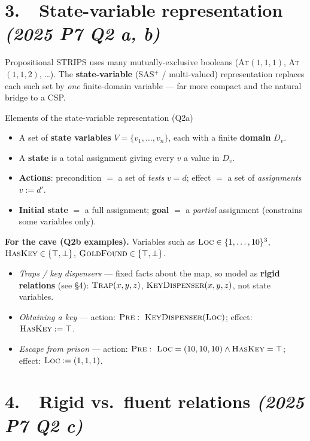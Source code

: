\documentclass[11pt,a4paper]{article}
\newcommand{\pred}[1]{\textsc{#1}}
\newcommand{\pre}{\textsc{Pre}}
\begin{document}
\section*{3.\ \ State-variable representation \hfill {\normalfont\itshape (2025 P7 Q2 a, b)}}

Propositional STRIPS uses many mutually-exclusive booleans (\pred{At}$(1,1,1)$, \pred{At}$(1,1,2)$, \dots). The \textbf{state-variable} (SAS$^+$ / multi-valued) representation replaces each such set by \emph{one} finite-domain variable --- far more compact and the natural bridge to a CSP.

\begin{defbox}{Elements of the state-variable representation (Q2a)}
\begin{itemize}[leftmargin=*,itemsep=1pt]
  \item A set of \textbf{state variables} $V=\{v_1,\dots,v_n\}$, each with a finite \textbf{domain} $D_{v}$.
  \item A \textbf{state} is a total assignment giving every $v$ a value in $D_v$.
  \item \textbf{Actions}: precondition $=$ a set of \emph{tests} $v=d$; effect $=$ a set of \emph{assignments} $v:=d'$.
  \item \textbf{Initial state} $=$ a full assignment; \textbf{goal} $=$ a \emph{partial} assignment (constrains some variables only).
\end{itemize}
\end{defbox}

\textbf{For the cave (Q2b examples).} Variables such as
$\pred{Loc}\in\{1,\dots,10\}^3$, $\pred{HasKey}\in\{\top,\bot\}$, $\pred{GoldFound}\in\{\top,\bot\}$.
\begin{itemize}[leftmargin=*,itemsep=1pt]
  \item \emph{Traps / key dispensers} --- fixed facts about the map, so model as \textbf{rigid relations} (see §4): $\pred{Trap}(x,y,z)$, $\pred{KeyDispenser}(x,y,z)$, not state variables.
  \item \emph{Obtaining a key} --- action: $\pre:\ \pred{KeyDispenser}(\pred{Loc})$; effect: $\pred{HasKey}:=\top$.
  \item \emph{Escape from prison} --- action: $\pre:\ \pred{Loc}=(10,10,10)\wedge \pred{HasKey}=\top$; effect: $\pred{Loc}:=(1,1,1)$.
\end{itemize}

\section*{4.\ \ Rigid vs.\ fluent relations \hfill {\normalfont\itshape (2025 P7 Q2 c)}}
\end{document}
